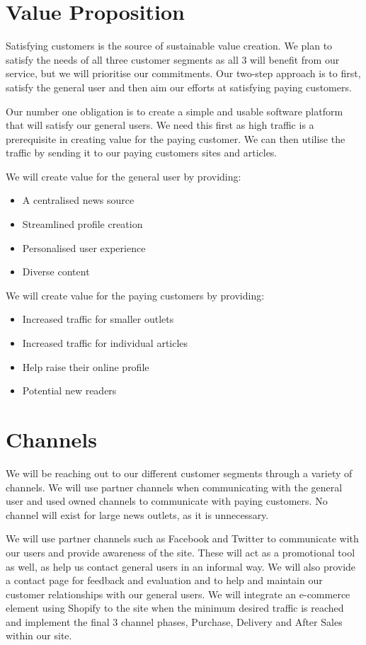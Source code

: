 \documentclass[11pt]{article}
\begin{document}
\section{Value Proposition}

Satisfying customers is the source of sustainable value creation.\citep{kaplan2004strategy} We plan to satisfy the needs of all three customer segments as all 3 will benefit from our service, but we will prioritise our commitments. Our two-step approach is to first,  satisfy the general user and then aim our efforts at satisfying paying customers. 

Our number one obligation is to create a simple and usable software platform that will satisfy our general users. We need this first as high traffic is a prerequisite in creating value for the paying customer. We can then utilise the traffic by sending it to our paying customers sites and articles.  

We will create value for the general user by providing:

\begin{itemize}
\item A centralised news source
\item Streamlined profile creation
\item Personalised user experience
\item Diverse content
\end{itemize}

We will create value for the paying customers by providing:
\begin{itemize}
\item Increased traffic for smaller outlets
\item Increased traffic for individual articles 
\item Help raise their online profile
\item Potential new readers 
\end{itemize}

\section{Channels}
We will be reaching out to our different customer segments through a variety of channels. We will use partner channels when communicating with the general user and used owned channels to communicate with paying customers. No channel will exist for large news outlets, as it is unnecessary.

We will use partner channels such as Facebook \cite{fb} and Twitter \cite{twitter} to communicate with our users and provide awareness of the site. These will act as a promotional tool as well, as help us contact general users in an informal way. We will also provide a contact page for feedback and evaluation and to help and maintain our customer relationships with our general users. We will integrate an e-commerce element using Shopify \cite{shopify} to the site when the minimum desired traffic is reached and implement the final 3 channel phases, Purchase, Delivery and After Sales within our site. 
\end{document}
